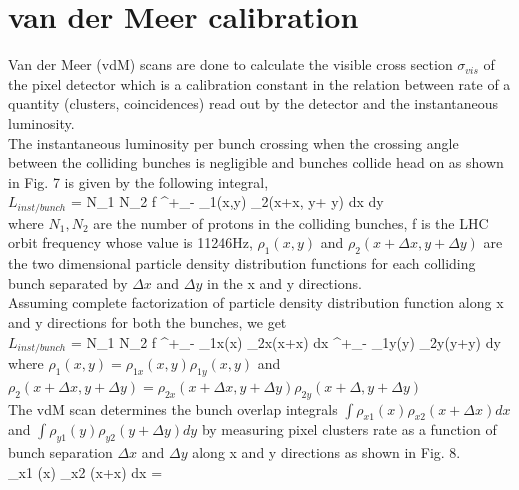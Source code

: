  \section{van der Meer calibration}
\label{sec:vdm}
Van der Meer (vdM) scans are done to calculate the visible cross section $\sigma_{vis}$ of the pixel detector which is a calibration constant in the relation between rate of a quantity (clusters, coincidences) read out by the detector and the instantaneous luminosity. \\

The instantaneous luminosity  per bunch crossing when the crossing angle between the colliding bunches is negligible and bunches collide head on as shown in Fig. 7 is given by the following integral, \cite{CMS-PAS-LUM-13-001} \\

$L_{inst/bunch}$ = N_1 N_2 f \int^{+\infty}_{-\infty} \rho_1(x,y) \rho_2(x+\Delta x, y+ \Delta y) dx dy \\

where $N_1, N_2$ are the number of protons in the colliding bunches, f is the LHC orbit frequency whose value is 11246Hz,  $\rho_1(x,y)$ and $\rho_2(x+\Delta x,y+\Delta y)$ are the two dimensional particle density distribution functions for each colliding bunch separated by $\Delta x$ and $\Delta y$ in the x and y directions. \\

Assuming complete factorization of particle density distribution function along x and y directions for both the bunches, we get \\

$L_{inst/bunch}$ = N_1 N_2 f \int^{+\infty}_{-\infty} \rho_{1x}(x) \rho_{2x}(x+\Delta x)  dx   \int^{+\infty}_{-\infty} \rho_{1y}(y) \rho_{2y}(y+\Delta y)  dy \\

where $\rho_1(x,y) = \rho_{1x}(x,y) \rho_{1y} (x,y)$ and $\rho_2(x+\Delta x,y + \Delta y) = \rho_{2x}(x+\Delta x,y+\Delta y) \rho_{2y} (x+\Delta,y+\Delta y)$ \\

The vdM scan determines the bunch  overlap integrals $\int \rho_{x1} (x) \rho_{x2} (x+\Delta x) dx$ and  $\int \rho_{y1}(y) \rho_{y2} (y+\Delta y) dy$ by measuring pixel clusters rate as a function of bunch separation $\Delta x$ and $\Delta y$ along x and y directions as shown in Fig. 8. \\

\int \rho_{x1} (x) \rho_{x2} (x+\Delta x) dx =  \\

